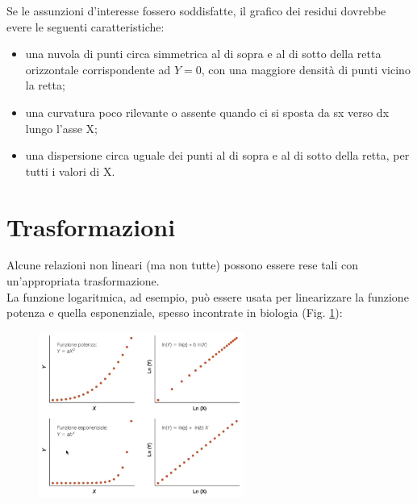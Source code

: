 \documentclass[10pt, draft]{book}
\newcommand{\tightlist}{%
\setlength{\itemsep}{1pt}\setlength{\parskip}{0pt}\setlength{\parsep}{0pt}}
\begin{document}
Se le assunzioni d'interesse fossero soddisfatte, il grafico dei residui dovrebbe evere le seguenti caratteristiche:
\begin{itemize}\tightlist
    \item una nuvola di punti circa simmetrica al di sopra e al di sotto della retta orizzontale corrispondente ad $Y=0$, con una maggiore densità di punti vicino la retta;
    \item una curvatura poco rilevante o assente quando ci si sposta da sx verso dx lungo l'asse X;
    \item una dispersione circa uguale dei punti al di sopra e al di sotto della retta, per tutti i valori di X.
\end{itemize}

\section{Trasformazioni}

Alcune relazioni non lineari (ma non tutte) possono essere rese tali con un'appropriata trasformazione.\\
La funzione logaritmica, ad esempio, può essere usata per linearizzare la funzione potenza e quella esponenziale, spesso incontrate in biologia (Fig. \ref{fig17.6-1}):\\
\begin{figure}[H]
    \centering
    \includegraphics[width=0.6\textwidth]{fig17.6-1}
    \caption{\small{}}
    \label{fig17.6-1}
\end{figure}
\end{document}
